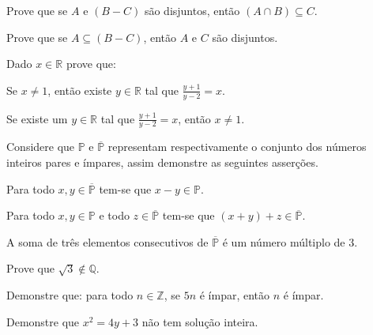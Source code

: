 \begin{questao}\label{test:Demosntracoes2}
	Prove que se $A$ e $(B - C)$ são disjuntos, então $(A \cap B) \subseteq C$.
\end{questao}

\begin{questao}\label{test:Demosntracoes3}
	Prove que se $A \subseteq (B - C)$, então $A$ e $C$ são disjuntos.
\end{questao}

\begin{questao}\label{test:Demosntracoes4}
	Dado $x \in \mathbb{R}$ prove que:
\end{questao}

\begin{exerList}
	\item Se $x \neq 1$, então existe $y \in \mathbb{R}$ tal que $\frac{y+1}{y-2} = x$.
	\item Se existe um $y \in \mathbb{R}$ tal que  $\frac{y+1}{y-2} = x$, então $x \neq 1$.
\end{exerList}

\begin{questao}\label{test:Demosntracoes8}
	Considere que $\mathbb{P}$ e $\overline{\mathbb{P}}$ representam respectivamente o conjunto dos números inteiros pares e ímpares, assim demonstre as seguintes asserções. 
\end{questao}

\begin{exerList}
	\item Para todo $x, y \in \overline{\mathbb{P}}$ tem-se que $x - y \in \mathbb{P}$.
	\item Para todo $x, y\in \mathbb{P}$ e todo $z \in \overline{\mathbb{P}}$ tem-se que $(x + y) + z \in \overline{\mathbb{P}}$.
	\item A soma de três elementos consecutivos de $\overline{\mathbb{P}}$ é um número múltiplo de $3$.
\end{exerList}

\begin{questao}\label{test:Demosntracoes9}
	Prove que $\sqrt{3} \notin \mathbb{Q}$.
\end{questao}

\begin{questao}\label{test:Demosntracoes10}
	Demonstre que: para todo $n \in \mathbb{Z}$, se $5n$ é ímpar, então $n$ é ímpar.
\end{questao}

\begin{questao}\label{test:Demosntracoes11}
	Demonstre que $x^2 = 4y + 3$ não tem solução inteira.
\end{questao}

